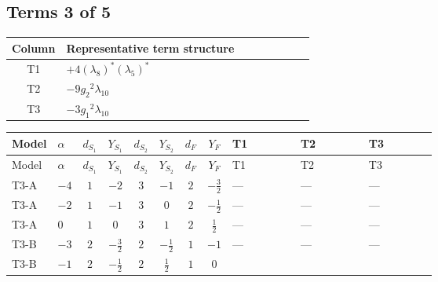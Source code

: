 \documentclass[8pt]{article}
\begin{document}
\begin{landscape}
\subsection*{Terms 3 of 5}
\begin{center}
\begin{tabular}{@{}c >{\raggedright\arraybackslash}p{0.82\linewidth}@{}}
\toprule
Column & Representative term structure \\
\midrule
T1 & \(\displaystyle +4 \left({\lambda_{8}}\right)^{*} \left({\lambda_5}\right)^{*}\) \\
\midrule
T2 & \(\displaystyle -9 {g_2}^2 {\lambda_{10}}\) \\
\midrule
T3 & \(\displaystyle -3 {g_1}^2 {\lambda_{10}}\) \\
\midrule
\bottomrule
\end{tabular}
\end{center}
\smallskip
\tiny
\begin{longtable}{@{}llcccccc >{\raggedright\arraybackslash}p{0.21\linewidth} >{\raggedright\arraybackslash}p{0.21\linewidth} >{\raggedright\arraybackslash}p{0.21\linewidth}@{}}
\toprule
Model & $\alpha$ & $d_{S_1}$ & $Y_{S_1}$ & $d_{S_2}$ & $Y_{S_2}$ & $d_F$ & $Y_F$ & T1 & T2 & T3 \\
\midrule
\endfirsthead
\toprule
Model & $\alpha$ & $d_{S_1}$ & $Y_{S_1}$ & $d_{S_2}$ & $Y_{S_2}$ & $d_F$ & $Y_F$ & T1 & T2 & T3 \\
\midrule
\endhead
T3-A & $-4$ & $1$ & $-2$ & $3$ & $-1$ & $2$ & $-\frac{3}{2}$ & --- & --- & --- \\
\midrule
T3-A & $-2$ & $1$ & $-1$ & $3$ & $0$ & $2$ & $-\frac{1}{2}$ & --- & --- & --- \\
\midrule
T3-A & $0$ & $1$ & $0$ & $3$ & $1$ & $2$ & $\frac{1}{2}$ & --- & --- & --- \\
\midrule
T3-B & $-3$ & $2$ & $-\frac{3}{2}$ & $2$ & $-\frac{1}{2}$ & $1$ & $-1$ & --- & --- & --- \\
\midrule
T3-B & $-1$ & $2$ & $-\frac{1}{2}$ & $2$ & $\frac{1}{2}$ & $1$ & $0$ & \scriptsize\adjustbox{max width=\linewidth}{$\begin{gathered} +4 \left({\lambda_{8}}\right)^{*} \left({\lambda_5}\right)^{*}\end{gathered}$} & \scriptsize\adjustbox{max width=\linewidth}{$\begin{gathered} -9 {g_2}^2 {\lambda_{10}}\end{gathered}$} & \scriptsize\adjustbox{max width=\linewidth}{$\begin{gathered} -3 {g_1}^2 {\lambda_{10}}\end{gathered}$} \\

\end{longtable}
\end{landscape}
\end{document}
